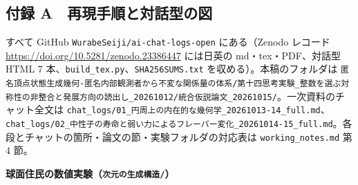 \documentclass[
  a4paper,
]{ltjsarticle}
\begin{document}
\subsection{付録
A　再現手順と対話型の図}\label{ux4ed8ux9332-a-ux518dux73feux624bux9806ux3068ux5bfeux8a71ux578bux306eux56f3}

すべて GitHub \texttt{WurabeSeiji/\allowbreak{}ai-chat-logs-open} にある（Zenodo
レコード \url{https://doi.org/10.5281/zenodo.23386447} には日英の
md・tex・PDF、対話型 HTML 7
本、\texttt{build\_\allowbreak{}tex.py}、\texttt{SHA256SUMS.txt}
を収める）。本稿のフォルダは
\texttt{匿名頂点状態生成幾何-匿名内部観測者から不変な関係量の体系/\allowbreak{}第十四思考実験\_\allowbreak{}整数を選ぶ対称性の非整合と発展方向の読出し\_\allowbreak{}20261012/\allowbreak{}統合仮説論文\_\allowbreak{}20261015/\allowbreak{}}。一次資料のチャット全文は
\texttt{chat\_\allowbreak{}logs/\allowbreak{}01\_\allowbreak{}円周上の内在的な幾何学\_\allowbreak{}20261013-14\_\allowbreak{}full.md}、\texttt{chat\_\allowbreak{}logs/\allowbreak{}02\_\allowbreak{}中性子の寿命と弱い力によるフレーバー変化\_\allowbreak{}20261014-15\_\allowbreak{}full.md}。各段とチャットの箇所・論文の節・実験フォルダの対応表は
\texttt{working\_\allowbreak{}notes.md} 第 4 節。

\textbf{球面住民の数値実験（\texttt{次元の生成構造/\allowbreak{}}）}
\end{document}
